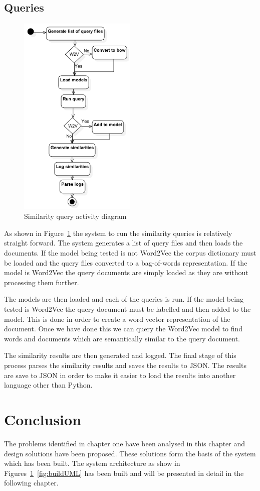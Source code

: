 \subsection{Queries}
\begin{figure}[h]
    \centering
        \includegraphics[width=0.5\textwidth]{Figures/ArchictectureQueryUML.png}
    \caption{Similarity query activity diagram}
    \label{fig:queryUML}
\end{figure}
As shown in Figure~\ref{fig:queryUML} the system to run the similarity queries is relatively straight forward.
The system generates a list of query files and then loads the documents.
If the model being tested is not Word2Vec the corpus dictionary must be loaded and the query files converted to a bag-of-words representation.
If the model is Word2Vec the query documents are simply loaded as they are without processing them further.

The models are then loaded and each of the queries is run.
If the model being tested is Word2Vec the query document must be labelled and then added to the model.
This is done in order to create a word vector representation of the document.
Once we have done this we can query the Word2Vec model to find words and documents which are semantically similar to the query document.

The similarity results are then generated and logged.
The final stage of this process parses the similarity results and saves the results to JSON.
The results are save to JSON in order to make it easier to load the results into another language other than Python.

\section{Conclusion}
The problems identified in chapter one have been analysed in this chapter and design solutions have been proposed.
These solutions form the basis of the system which has been built.
The system architecture as show in Figures~\ref{fig:queryUML}~\ref{fig:buildUML} has been built and will be presented in detail in the following chapter.
